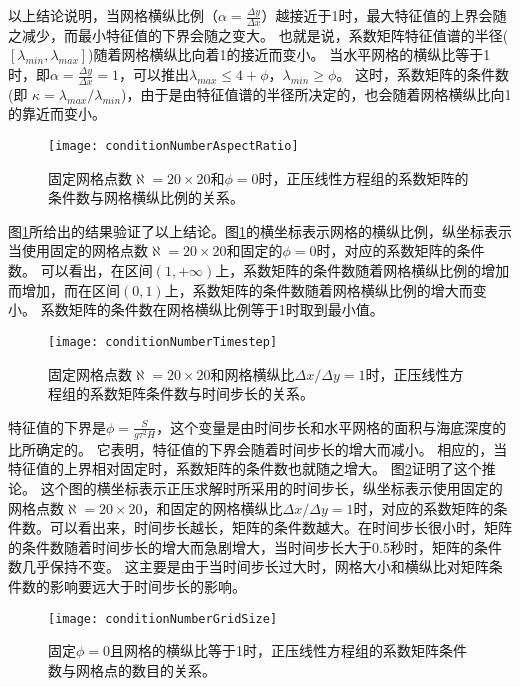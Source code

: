 以上结论说明，当网格横纵比例（$\alpha  = \frac{ \Delta y}{ \Delta x }$）越接近于1时，最大特征值的上界会随之减少，而最小特征值的下界会随之变大。
也就是说，系数矩阵特征值谱的半径($[\lambda_{min}, \lambda_{max}]$)随着网格横纵比向着1的接近而变小。 
当水平网格的横纵比等于1时，即$ \alpha = \frac{ \Delta y}{ \Delta x} = 1$，可以推出$\lambda_{max} \le  4 +\phi$，$\lambda_{min} \ge   \phi$。
这时，系数矩阵的条件数(即 $\kappa=  \lambda_{max}/\lambda_{min}$)，由于是由特征值谱的半径所决定的，也会随着网格横纵比向1的靠近而变小。 

\begin{figure}[ht]
\centering
\texttt{[image: conditionNumberAspectRatio]}
\caption[] {固定网格点数$\aleph = 20\times 20$和$\phi = 0$时，正压线性方程组的系数矩阵的条件数与网格横纵比例的关系。 \label{fig:conditionNumberRatio}}
\end{figure}
图\ref{fig:conditionNumberRatio}所给出的结果验证了以上结论。图\ref{fig:conditionNumberRatio}的横坐标表示网格的横纵比例，纵坐标表示当使用固定的网格点数$\aleph = 20\times 20$和固定的$\phi = 0$时，对应的系数矩阵的条件数。 
可以看出，在区间$(1, +\infty)$上，系数矩阵的条件数随着网格横纵比例的增加而增加，而在区间$(0,1)$上，系数矩阵的条件数随着网格横纵比例的增大而变小。
系数矩阵的条件数在网格横纵比例等于1时取到最小值。
 
\begin{figure}[ht]
\centering
\texttt{[image: conditionNumberTimestep]}
\caption[] {固定网格点数$\aleph= 20\times 20$和网格横纵比$\Delta x /{\Delta y} = 1$时，正压线性方程组的系数矩阵条件数与时间步长的关系。 \label{fig:conditionNumberDt}}
\end{figure}
特征值的下界是$\phi=\frac{S }{g \tau^2 H}$，这个变量是由时间步长和水平网格的面积与海底深度的比所确定的。
它表明，特征值的下界会随着时间步长的增大而减小。 
相应的，当特征值的上界相对固定时，系数矩阵的条件数也就随之增大。
图\ref{fig:conditionNumberDt}证明了这个推论。
这个图的横坐标表示正压求解时所采用的时间步长，纵坐标表示使用固定的网格点数$\aleph= 20\times 20$，和固定的网格横纵比$\Delta x /{\Delta y} = 1$时，对应的系数矩阵的条件数。可以看出来，时间步长越长，矩阵的条件数越大。在时间步长很小时，矩阵的条件数随着时间步长的增大而急剧增大，当时间步长大于0.5秒时，矩阵的条件数几乎保持不变。
这主要是由于当时间步长过大时，网格大小和横纵比对矩阵条件数的影响要远大于时间步长的影响。

\begin{figure}[ht]
\centering
\texttt{[image: conditionNumberGridSize]}
\caption[] {固定$\phi=0$且网格的横纵比等于1时，正压线性方程组的系数矩阵条件数与网格点的数目的关系。 \label{fig:conditionNumbGrid}}
\end{figure}
 
